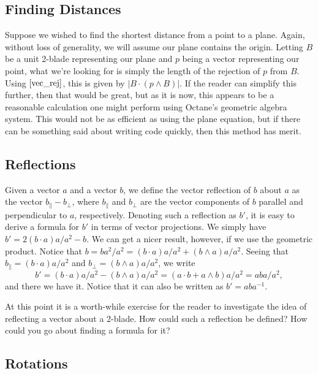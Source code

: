 \documentclass{article}
\newcommand{\prl}{\parallel}
\newcommand{\prp}{\perp}
\begin{document}
\subsection{Finding Distances}

Suppose we wished to find the shortest distance from a point to a plane.
Again, without loss of generality, we will assume our plane contains
the origin.  Letting $B$ be a unit 2-blade representing our plane and $p$
being a vector representing our point, what we're looking for is simply
the length of the rejection of $p$ from $B$.  Using $\eqref{vec_rej}$,
this is given by $|B\cdot(p\wedge B)|$.  If the reader can simplify this further, then
that would be great, but as it is now, this appears to be a reasonable
calculation one might perform using Octane's geometric algebra system.  This would not
be as efficient as using the plane equation, but if there can be something said
about writing code quickly, then this method has merit.

\subsection{Reflections}

Given a vector $a$ and a vector $b$, we define the vector reflection
of $b$ about $a$ as the vector $b_{\prl}-b_{\prp}$, where $b_{\prl}$
and $b_{\prp}$ are the vector components of $b$ parallel and
perpendicular to $a$, respectively.  Denoting such a reflection as
$b'$, it is easy to derive a formula for $b'$ in terms
of vector projections.  We simply have $b'=2(b\cdot a)a/a^2-b$.
We can get a nicer result, however, if we use the geometric product.
Notice that $b=ba^2/a^2=(b\cdot a)a/a^2 + (b\wedge a)a/a^2$.
Seeing that $b_{\prl}=(b\cdot a)a/a^2$ and $b_{\prp}=(b\wedge a)a/a^2$,
we write
\begin{equation*}
b' = (b\cdot a)a/a^2 - (b\wedge a)a/a^2 = (a\cdot b+a\wedge b)a/a^2 = aba/a^2,
\end{equation*}
and there we have it.
Notice that it can also be written as $b'=aba^{-1}$.

At this point it is a worth-while exercise for the reader to investigate
the idea of reflecting a vector about a 2-blade.  How could such a reflection
be defined?  How could you go about finding a formula for it?

\subsection{Rotations}\label{section_rotations}
\end{document}
